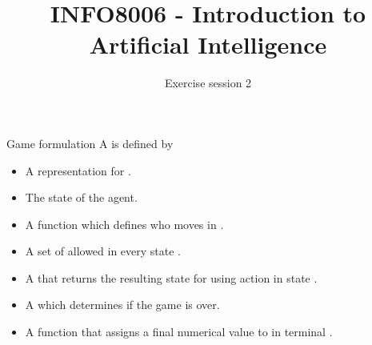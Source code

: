 \documentclass[11pt, a4paper]{article}
\title{INFO8006 - Introduction to Artificial Intelligence}
\subtitle{Exercise session 2}
\begin{document}
\maketitle

\begin{thbox}{Game formulation}
    A  is defined by    
    \begin{itemize}
        \item A representation for .
        \item The  state of the agent.
        \item A  function  which defines who moves in .
        \item A set of  allowed in every state .
        \item A  that returns the resulting state  for using action  in state . 
        \item A  which determines if the game is over.
        \item A  function  that assigns a final numerical value to  in terminal . 
    \end{itemize}
\end{thbox}
\end{document}
